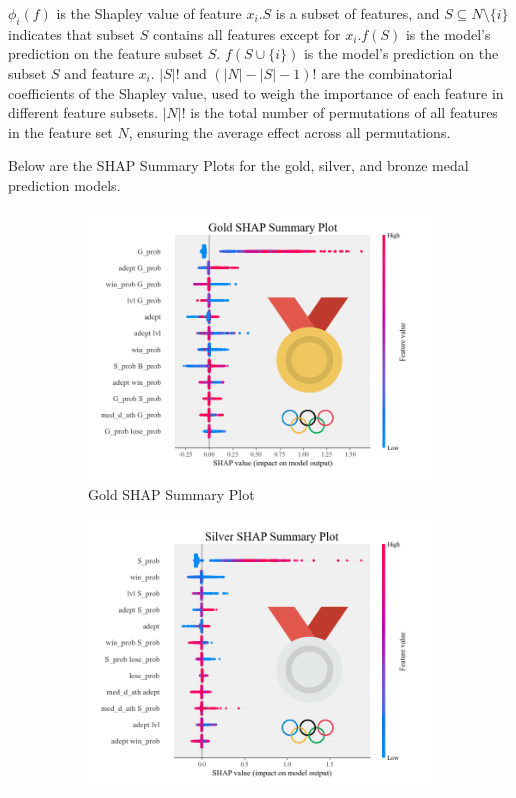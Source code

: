\documentclass[12pt]{article}  %
\begin{document}
\(\phi_i(f)\) is the Shapley value of feature \(x_i\).\(S\) is a subset of features, and \(S \subseteq N \setminus \{i\}\) indicates that subset \(S\) contains all features except for \(x_i\).\(f(S)\) is the model's prediction on the feature subset \(S\).
\(f(S \cup \{i\})\) is the model's prediction on the subset \(S\) and feature \(x_i\).
\(|S|!\) and \((|N|-|S|-1)!\) are the combinatorial coefficients of the Shapley value, used to weigh the importance of each feature in different feature subsets.
\(|N|!\) is the total number of permutations of all features in the feature set \(N\), ensuring the average effect across all permutations.

Below are the SHAP Summary Plots for the gold, silver, and bronze medal prediction models.


\begin{figure}[htbp]
	\centering
	\begin{subfigure}[b]{.32\textwidth}
		\includegraphics[width=\textwidth]{img/shap1.png}
		\caption{Gold SHAP Summary Plot}\label{subfig:1}
	\end{subfigure}
	\hfill 
	\begin{subfigure}[b]{.32\textwidth}
		\includegraphics[width=\textwidth]{img/shap2.png}

\end{subfigure}
\end{figure}
\end{document}

